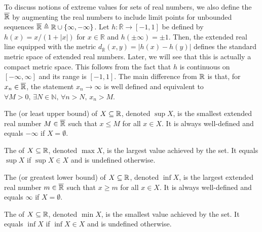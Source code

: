 To discuss notions of extreme values for sets of real numbers, we also define the  $\overline{\mathbb{R}}$ by augmenting the real numbers to include limit points for unbounded sequences $\overline{\mathbb{R}} \triangleq \mathbb{R} \cup \{ \infty,-\infty\}$.
Let $h:\overline{\mathbb R}\to[-1,1]$ be defined by $h(x)=x/(1+|x|)$ for $x\in\mathbb R$ and $h(\pm\infty)=\pm1$.
Then, the extended real line equipped with the metric $d_{\overline{\mathbb R}}(x,y)=|h(x)-h(y)|$ defines the standard metric space of extended real numbers.
Later, we will see that this is actually a compact metric space.
This follows from the fact that $h$ is continuous on $[-\infty,\infty]$ and its range is $[-1,1]$.
The main difference from $\mathbb{R}$ is that, for  $x_n \in \overline{\mathbb{R}}$, the statement  $x_n \to \infty$ is well defined and equivalent to $\forall M>0, \, \exists N\in \mathbb{N}, \, \forall n>N, \, x_n > M$.
\begin{definition}
The  (or least upper bound) of $X\subseteq \mathbb{R}$, denoted $\sup X$, is the smallest extended real number $M \in \overline{\mathbb{R}}$ such that $x\leq M$ for all $x\in X$.
It is always well-defined and equals $-\infty$ if $X=\emptyset$.
\end{definition}

\begin{definition}
The  of $X\subseteq \mathbb{R}$, denoted $\max X$, is the largest value achieved by the set.
It equals $\sup X$ if $\sup X \in X$ and is undefined otherwise.
\end{definition}

\begin{definition}
The  (or greatest lower bound) of $X\subseteq \mathbb{R}$, denoted $\inf X$, is the largest extended real number $m \in \overline{\mathbb{R}}$ such that $x\geq m$ for all $x\in X$.
It is always well-defined and equals $\infty$ if $X=\emptyset$.
\end{definition}

\begin{definition}
The  of $X\subseteq \mathbb{R}$, denoted $\min X$, is the smallest value achieved by the set.
It equals $\inf X$ if $\inf X \in X$ and is undefined otherwise.
\end{definition}

